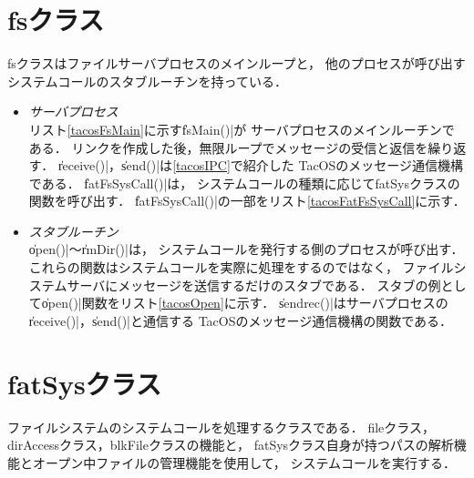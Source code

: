 \section{fsクラス}
fsクラスはファイルサーバプロセスのメインループと，
他のプロセスが呼び出すシステムコールのスタブルーチンを持っている．

\begin{itemize}
\item \emph{サーバプロセス}\\
  リスト\ref{tacosFsMain}に示す\|fsMain()|が
  サーバプロセスのメインルーチンである．
  リンクを作成した後，無限ループでメッセージの受信と返信を繰り返す．
  \|receive()|，\|send()|は\ref{tacosIPC}で紹介した
  TacOSのメッセージ通信機構である．
  \|fatFsSysCall()|は，
  システムコールの種類に応じてfatSysクラスの関数を呼び出す．
  \|fatFsSysCall()|の一部をリスト\ref{tacosFatFsSysCall}に示す．
  
  

  

\item \emph{スタブルーチン}\\
  \|open()|〜\|rmDir()|は，
  システムコールを発行する側のプロセスが呼び出す．
  これらの関数はシステムコールを実際に処理をするのではなく，
  ファイルシステムサーバにメッセージを送信するだけのスタブである．
  スタブの例として\|open()|関数をリスト\ref{tacosOpen}に示す．
  \|sendrec()|はサーバプロセスの\|receive()|，\|send()|と通信する
  TacOSのメッセージ通信機構の関数である．
    
  

\end{itemize}

\section{fatSysクラス}
ファイルシステムのシステムコールを処理するクラスである．
fileクラス，dirAccessクラス，blkFileクラスの機能と，
fatSysクラス自身が持つパスの解析機能とオープン中ファイルの管理機能を使用して，
システムコールを実行する．

